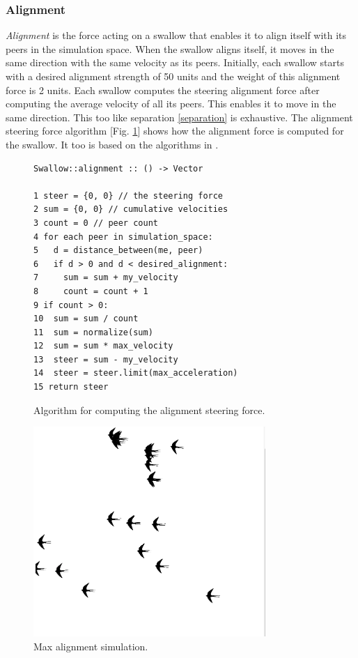 \documentclass[../main]{subfiles}
\begin{document}
\subsubsection{Alignment}
\label{alignment}

{\em Alignment} is the force acting on a swallow that enables it to align itself with its peers in the simulation space.
When the swallow aligns itself, it moves in the same direction with the same velocity as its peers. Initially, each swallow starts with a desired alignment strength of 50 units and the weight of this alignment force is 2 units. Each swallow computes the steering alignment force after computing the average velocity of all its peers. This enables it to move in the same direction. This too like separation \ref{separation} is exhaustive. The alignment steering force algorithm [Fig. \ref{alignmentLogic}] shows how the alignment force is computed for the swallow. It too is based on the algorithms in \cite{reynolds1999steering, danshiffman}.

\begin{figure}
	\begin{verbatim}
Swallow::alignment :: () -> Vector

1 steer = {0, 0} // the steering force
2 sum = {0, 0} // cumulative velocities
3 count = 0 // peer count
4 for each peer in simulation_space:
5   d = distance_between(me, peer)
6   if d > 0 and d < desired_alignment:
7     sum = sum + my_velocity
8     count = count + 1
9 if count > 0:
10  sum = sum / count
11  sum = normalize(sum)
12  sum = sum * max_velocity
13  steer = sum - my_velocity
14  steer = steer.limit(max_acceleration)
15 return steer
    \end{verbatim}
	\caption{Algorithm for computing the alignment steering force.}
	\label{alignmentLogic}
\end{figure}

\begin{figure}
    \centering
	\includegraphics[scale=0.30, width=250pt]{resources/flocker_max_alignment.png}
	\caption{Max alignment simulation.}
	\label{maxAlignmentImg}
\end{figure}
\end{document}
